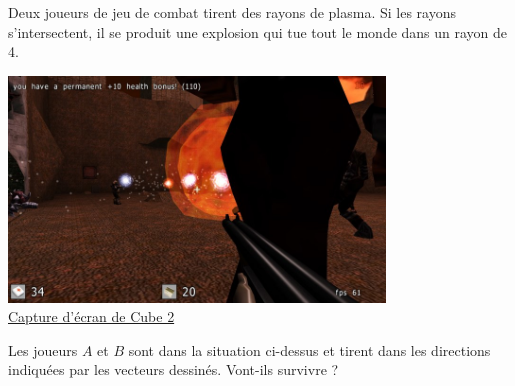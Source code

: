 
\begin{exercice}\label{exosmath-0339}

    Deux joueurs de jeu de combat tirent des rayons de plasma. Si les rayons s'intersectent, il se produit une explosion qui tue tout le monde dans un rayon de \unit{4}{\meter}. 



    \begin{minipage}{0.5\textwidth}
        \begin{center}
\includegraphics[width=10cm]{screenshot_5891783.png}\\
\href{http://sauerbraten.org/}{Capture d'écran de Cube 2}
        \end{center}
    \end{minipage}
    \hspace{1mm}
    \begin{minipage}{0.5\textwidth}
        \begin{center}

        \end{center}
    \end{minipage}

    Les joueurs \( A\) et \( B\) sont dans la situation ci-dessus et tirent dans les directions indiquées par les vecteurs dessinés. Vont-ils survivre ? 
    
\end{exercice}
